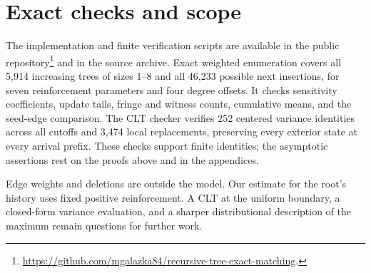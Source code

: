 \documentclass[runningheads,envcountsame,orivec]{llncs}
\begin{document}
\section{Exact checks and scope}

The implementation and finite verification scripts are available in
the public repository\footnote{\url{https://github.com/mgalazka84/recursive-tree-exact-matching}.}
and in the source archive. Exact weighted enumeration covers all
5,914 increasing trees of sizes 1--8 and all 46,233 possible next
insertions, for seven reinforcement parameters and four degree
offsets. It checks sensitivity coefficients, update tails, fringe and
witness counts, cumulative means, and the seed-edge comparison.
The CLT checker verifies 252 centered variance identities across
all cutoffs and 3,474 local replacements, preserving every exterior
state at every arrival prefix. These checks support finite identities;
the asymptotic assertions rest on the proofs above and in the appendices.

Edge weights and deletions are outside the model. Our estimate for
the root's history uses fixed positive reinforcement. A CLT at the
uniform boundary, a closed-form variance evaluation, and a sharper
distributional description of the maximum remain questions for
further work.
\end{document}
